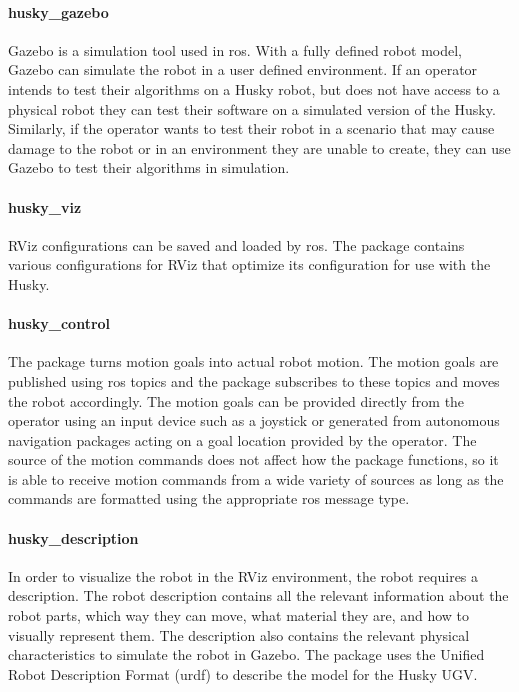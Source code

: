 \paragraph{husky\_gazebo}

Gazebo is a simulation tool used in \acrshort{ros}. With a fully defined robot model, Gazebo can simulate the robot in a user defined environment. If an operator intends to test their algorithms on a Husky robot, but does not have access to a physical robot they can test their software on a simulated version of the Husky. Similarly, if the operator wants to test their robot in a scenario that may cause damage to the robot or in an environment they are unable to create, they can use Gazebo to test their algorithms in simulation.\\

\paragraph{husky\_viz}

RViz configurations can be saved and loaded by \acrshort{ros}. The  package contains various configurations for RViz that optimize its configuration for use with the Husky.\\

\paragraph{husky\_control}

The package  turns motion goals into actual robot motion. The motion goals are published using \acrshort{ros} topics and the  package subscribes to these topics and moves the robot accordingly. The motion goals can be provided directly from the operator using an input device such as a joystick or generated from autonomous navigation packages acting on a goal location provided by the operator. The source of the motion commands does not affect how the package functions, so it is able to receive motion commands from a wide variety of sources as long as the commands are formatted using the appropriate \acrshort{ros} message type.\\ 

\paragraph{husky\_description}

In order to visualize the robot in the RViz environment, the robot requires a description. The robot description contains all the relevant information about the robot parts, which way they can move, what material they are, and how to visually represent them. The description also contains the relevant physical characteristics to simulate the robot in Gazebo. The  package uses the Unified Robot Description Format (\acrshort{urdf}) to describe the model for the Husky UGV.\\

